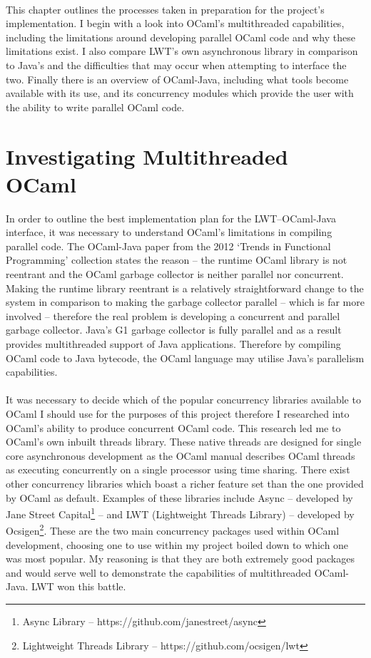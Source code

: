 \documentclass[12pt,twoside,notitlepage]{report}
\begin{document}
%
%
\hfill\\
This chapter outlines the processes taken in preparation for the project's implementation. I begin with a look into OCaml's multithreaded capabilities, including the limitations around developing parallel OCaml code and why these
limitations exist. I also compare LWT's own asynchronous library in comparison to Java's and the difficulties that may occur when attempting to interface the two. Finally there is an overview of OCaml-Java, including what tools become
available with its use, and its concurrency modules which provide the user with the ability to write parallel OCaml code. 

\section{Investigating Multithreaded OCaml}
\label{sec:investigating_multithreaded_ocaml}
%
%
In order to outline the best implementation plan for the LWT--OCaml-Java interface, it was necessary to understand OCaml's limitations in compiling parallel code. The OCaml-Java paper from the 2012 `Trends in Functional Programming'
collection\cite{clerc2012} states the reason -- the runtime OCaml library is not reentrant and the OCaml garbage collector is neither parallel nor concurrent. Making the runtime library reentrant is a relatively straightforward change
to the system in comparison to making the garbage collector parallel -- which is far more involved -- therefore the real problem is developing a concurrent and parallel garbage collector. Java's G1 garbage collector is fully
parallel\cite{web:garbage-first} and as a result provides multithreaded support of Java applications. Therefore by compiling OCaml code to Java bytecode, the OCaml language may utilise Java's parallelism capabilities.
\hfill\\
\hfill\\
%
%
It was necessary to decide which of the popular concurrency libraries available to OCaml I should use for the purposes of this project therefore I researched into OCaml's ability to produce concurrent OCaml code. This research led me
to OCaml's own inbuilt threads library. These native threads are designed for single core asynchronous development as the OCaml manual\cite{leroy2013} describes OCaml threads as executing concurrently on a single processor using time
sharing. There exist other concurrency libraries which boast a richer feature set than the one provided by OCaml as default. Examples of these libraries include Async -- developed by Jane Street Capital\footnote{Async Library --
https://github.com/janestreet/async} -- and LWT (Lightweight Threads Library) -- developed by Ocsigen\footnote{Lightweight Threads Library -- https://github.com/ocsigen/lwt}. These are the two main concurrency packages used within
OCaml development, choosing one to use within my project boiled down to which one was most popular. My reasoning is that they are both extremely good packages and would serve well to demonstrate the capabilities of multithreaded
OCaml-Java. LWT won this battle.
\end{document}
